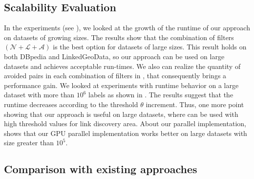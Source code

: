 
\subsection{Scalability Evaluation}

In the experiments (see ), we looked at the growth of the runtime of our approach on datasets of growing sizes.
The results show that the combination of filters $(\mathcal{N}+\mathcal{L}+\mathcal{A})$ is the best option for datasets of large sizes.
This result holds on both DBpedia and LinkedGeoData, so our approach can be used on large datasets and achieves acceptable run-times. 
We also can realize the quantity of avoided pairs in each combination of filters in , that consequently brings a performance gain.
We looked at experiments with runtime behavior on a large dataset with more than $10^6$ labels as shown in . The results suggest that the runtime decreases according to the threshold $\theta$ increment. Thus, one more point showing that our approach is useful on large datasets, where can be used with high threshold values for link discovery area.
About our parallel implementation,  shows that our GPU parallel implementation works better on large datasets with size greater than $10^5$. 

\subsection{Comparison with existing approaches} \label{comparisons}

